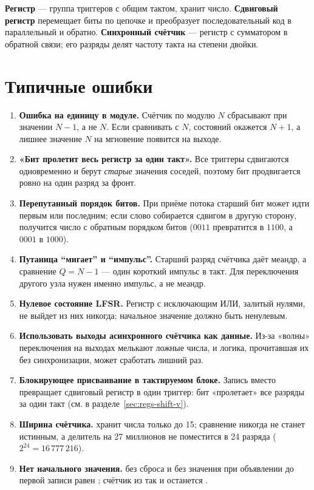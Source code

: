 \begin{ideabox}
\textbf{Регистр} --- группа триггеров с общим тактом, хранит число.
\textbf{Сдвиговый регистр} перемещает биты по цепочке и преобразует
последовательный код в параллельный и обратно. \textbf{Синхронный счётчик}
--- регистр с сумматором в обратной связи; его разряды делят частоту такта
на степени двойки.
\end{ideabox}

\section{Типичные ошибки}

\begin{warnbox}
\begin{enumerate}
  \item \textbf{Ошибка на единицу в модуле.} Счётчик по модулю $N$ сбрасывают
        при значении $N-1$, а не $N$. Если сравнивать с $N$, состояний
        окажется $N+1$, а лишнее значение $N$ на мгновение появится на
        выходе.
  \item \textbf{«Бит пролетит весь регистр за один такт».} Все триггеры
        сдвигаются одновременно и берут \emph{старые} значения соседей, поэтому
        бит продвигается ровно на один разряд за фронт.
  \item \textbf{Перепутанный порядок битов.} При приёме потока старший бит
        может идти первым или последним; если слово собирается сдвигом в
        другую сторону, получится число с обратным порядком битов
        ($0011$ превратится в $1100$, а $0001$ в $1000$).
  \item \textbf{Путаница ``мигает'' и ``импульс''.} Старший разряд счётчика
        даёт меандр, а сравнение $Q=N-1$ --- один короткий импульс в такт.
        Для переключения другого узла нужен именно импульс, а не меандр.
  \item \textbf{Нулевое состояние LFSR.} Регистр с исключающим ИЛИ, залитый
        нулями, не выйдет из них никогда; начальное значение должно быть
        ненулевым.
  \item \textbf{Использовать выходы асинхронного счётчика как данные.}
        Из-за «волны» переключения на выходах мелькают ложные числа, и логика,
        прочитавшая их без синхронизации, может сработать лишний раз.
  \item \textbf{Блокирующее присваивание в тактируемом блоке.} Запись
         вместо \code{<=} превращает сдвиговый
        регистр в один триггер: бит «пролетает» все разряды за один такт
        (см.  в разделе~\ref{sec:regs-shift-v}).
  \item \textbf{Ширина счётчика.}  хранит числа только
        до 15; сравнение  никогда не станет истинным, а
        делитель на 27 миллионов не поместится в 24 разряда ($2^{24}=16\,777\,216$).
  \item \textbf{Нет начального значения.}  без сброса и без
        значения при объявлении до первой записи равен ; счётчик из
         так и останется .
\end{enumerate}
\end{warnbox}

